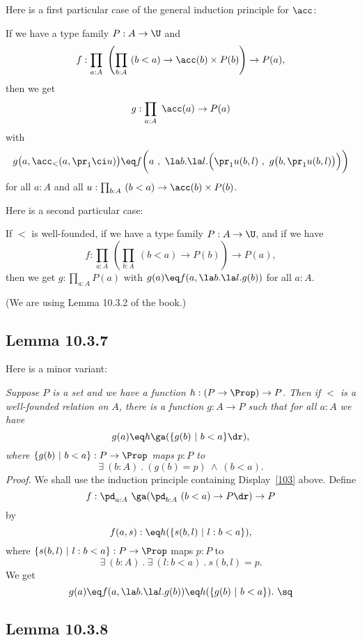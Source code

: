\documentclass[12pt]{article}
\begin{document}
Here is a first particular case of the general induction principle for $\acc$:

If we have a type family $P:A\to\U$ and %
$$
f:\prod_{a:A}\ \left(\prod_{b:A}\ (b<a)\to\acc(b)\times P(b)\right)\to P(a),%
$$ 
then we get 
$$
g:\prod_{a:A}\ \acc(a)\to P(a)
$$
with
$$
g\big(a,\acc_<(a,\pr_1\ci u)\big)\eq f\bigg(a\ ,\ \la b.\la l.\Big(\pr_1 u(b,l)\ ,\ g\big(b,\pr_1 u(b,l)\big)\Big)\bigg)
$$
for all $a:A$ and all $u:\prod_{b:A}\ (b<a)\to\acc(b)\times P(b)$. 

Here is a second particular case:

If $<$ is well-founded, if we have a type family $P:A\to\U$, and if we have 
\begin{equation}\label{103}
f:\prod_{a:A}\ \left(\prod_{b:A}\ (b<a)\to P(b)\right)\to P(a),
\end{equation} 
then we get $g:\prod_{a:A}P(a)$ with $g(a)\eq f(a,\la b.\la l.g(b))$ for all $a:A$.

(We are using Lemma 10.3.2 of the book.)


\subsection{Lemma 10.3.7}%

Here is a minor variant:

\nn\emph{Suppose $P$ is a set and we have a function $h:(P\to\Prop)\to P$. Then if $<$ is a well-founded relation on $A$, there is a function $g:A\to P$ such that for all $a:A$ we have} 
$$
g(a)\eq h\ga(\{g(b)\ \vert\ b<a\}\dr),
$$ 
\emph{where $\{g(b)\ \vert\ b<a\}:P\to\Prop$ maps $p:P$ to} 
$$
\exists\ (b:A)\ .\ (g(b)=p)\ \wedge\ (b<a).
$$ 
\emph{Proof.} We shall use the induction principle containing Display~\eqref{103} above. Define 
$$
f:\pd_{a:A}\ \ga(\pd_{b:A}\ (b<a)\to P\dr)\to P
$$ 
by 
$$
f(a,s):\eq h(\{s(b,l)\ \vert\ l:b<a\}),
$$ 
where $\{s(b,l)\ \vert\ l:b<a\}:P\to\Prop$ maps $p:P$ to 
$$
\exists\ (b:A)\ .\ \exists\ (l:b<a)\ .\ s(b,l)=p.
$$ 
We get 
$$
g(a)\eq f(a,\la b.\la l.g(b))\eq h(\{g(b)\ \vert\ b<a\}).\ \sq
$$ 


\subsection{Lemma 10.3.8}
\end{document}

